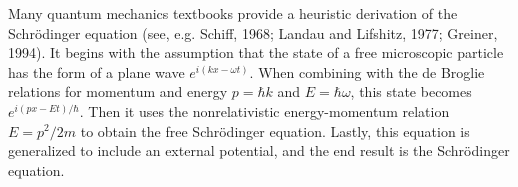 Many quantum mechanics textbooks provide a heuristic derivation of the Schr\"{o}dinger equation (see, e.g. Schiff, 1968;  Landau and Lifshitz, 1977; Greiner, 1994).
It begins with the assumption that the state of a free microscopic particle has the form of a plane wave $e^{i(kx-\omega t)}$. When combining with the de Broglie relations for momentum and energy $p=\hbar k$ and $E=\hbar \omega$, this state becomes $e^{i(px-Et)/\hbar}$. Then it uses the nonrelativistic energy-momentum relation $E=p^2/2m$ to obtain the free Schr\"{o}dinger equation. Lastly, this equation is generalized to include an external potential, and the end result is the Schr\"{o}dinger equation. 

